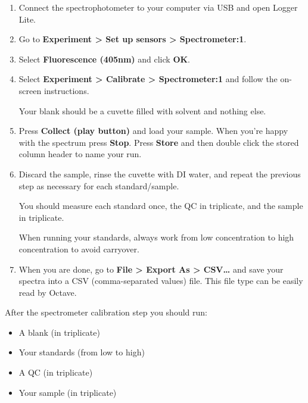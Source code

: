 \documentclass[]{tufte-book}
\providecommand{\tightlist}{%
  \setlength{\itemsep}{0pt}\setlength{\parskip}{0pt}}
\begin{document}
\begin{enumerate}
\def\labelenumi{\arabic{enumi}.}
\item
  Connect the spectrophotometer to your computer via USB and open Logger Lite.\\
\item
  Go to \textbf{Experiment \textgreater{} Set up sensors \textgreater{} Spectrometer:1}.\\
\item
  Select \textbf{Fluorescence (405nm)} and click \textbf{OK}.\\
\item
  Select \textbf{Experiment \textgreater{} Calibrate \textgreater{} Spectrometer:1} and follow the on-screen instructions.

  \begin{marginfigure}
   Your blank should be a cuvette filled with solvent and nothing else.
   \end{marginfigure}
\item
  Press \textbf{Collect (play button)} and load your sample. When you're happy with the spectrum press \textbf{Stop}. Press \textbf{Store} and then double click the stored column header to name your run.
\item
  Discard the sample, rinse the cuvette with DI water, and repeat the previous step as necessary for each standard/sample.

  \begin{marginfigure}
   You should measure each standard once, the QC in triplicate, and the
   sample in triplicate.

   When running your standards, always work from low concentration to high
   concentration to avoid carryover.
   \end{marginfigure}
\item
  When you are done, go to \textbf{File \textgreater{} Export As \textgreater{} CSV\ldots{}} and save your spectra into a CSV (comma-separated values) file. This file type can be easily read by Octave.
\end{enumerate}

After the spectrometer calibration step you should run:

\begin{itemize}
\tightlist
\item
  A blank (in triplicate)
\item
  Your standards (from low to high)
\item
  A QC (in triplicate)
\item
  Your sample (in triplicate)
\end{itemize}
\end{document}
